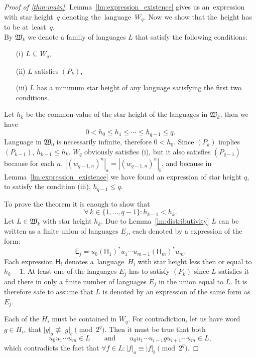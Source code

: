 \begin{proof}[Proof of \autoref*{thm:main}]
    Lemma~\ref*{lm:expression_existence} gives us an~expression with star height~$q$ denoting the~language~$W_q$. Now we show that the~height has to be at~least~$q$.\\
    By $\mathfrak{W}_k$ we denote a family of languages $L$ that satisfy the following conditions:
    \begin{enumerate}
        \item[(i)] $L \subseteq W_q$,
        \item[(ii)] $L$ satisfies $(P_k)$,
        \item[(iii)] $L$ has a minimum star height of any language satisfying the first two conditions.
    \end{enumerate}
    Let $h_k$ be the common value of the star height of the languages in $\mathfrak{W}_k$, then we have
    \[
        0 < h_0 \leq h_1 \leq \dotsb \leq h_{q-1} \leq q.
    \]
    Language in $\mathfrak{W}_0$ is necessarily infinite, therefore $0 < h_0$. Since $(P_k)$ implies $(P_{k-1})$, $h_{k-1} \leq h_k$. $W_q$ obviously satisfies (i), but it also satisfies $(P_{q-1})$ because for each $n$, $|{(w_{q-1,n})}^n|_a = |{(w_{q-1,n})}^n|_b$, and because in Lemma~\ref*{lm:expression_existence} we have found an expression of star height $q$, to satisfy the condition (iii), $h_{q-1} \leq q$.

    To prove the theorem it is enough to show that
    \[
        \forall \, k \in \{1,\dotsc,q-1\}: h_{k-1} < h_k.
    \]
    Let $L \in \mathfrak{W}_k$ with star height $h_k$. Due to Lemma~\ref*{lm:distributivity} $L$ can be written as a finite union of languages $E_j$, each denoted by a expression of the form:
    \[
        \mathsf{E}_j = u_0{(\mathsf{H}_1)}^*u_1 \dotsm u_{m-1}{(\mathsf{H}_m)}^*u_m.
    \]
    Each expression $\mathsf{H}_i$ denotes a~language~$H_i$ with star height less then or equal to $h_k-1$. At least one of the languages $E_j$ has to satisfy $(P_k)$ since $L$ satisfies it and there in only a finite number of languages $E_j$ in the union equal to $L$. It is therefore safe to assume that $L$ is denoted by an expression of the same form as $E_j$.

    Each of the $H_i$ must be contained in $W_q$. For contradiction, let us have word $g \in H_i$, that $|g|_a \not\equiv |g|_b \pmod{2^q}$. Then it must be true that both
    \[
        u_0 u_1 \dotsm u_m \in L \qquad \text{and} \qquad u_0 u_1 \dotsm u_{i-1} g u_{i+1} \dotsm u_m \in L,
    \]
    which contradicts the fact that $\forall f \in L: |f|_a \equiv |f|_b \pmod{2^q}$.


\end{proof}
